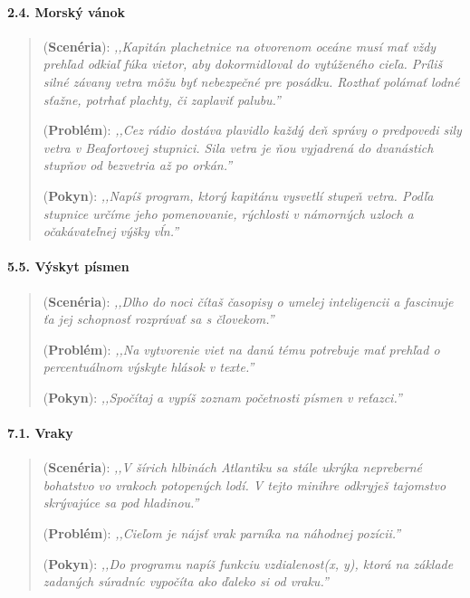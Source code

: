 \paragraph{2.4. Morský vánok}
\begin{quote}
(\textbf{Scenéria}): \textit{\small ,,Kapitán plachetnice na otvorenom oceáne musí mať vždy prehľad odkiaľ fúka vietor, aby dokormidloval do vytúženého cieľa. Príliš silné závany vetra môžu byť nebezpečné pre posádku. Rozthať polámať lodné sťažne, potrhať plachty, či zaplaviť palubu.''}

(\textbf{Problém}): \textit{\small ,,Cez rádio dostáva plavidlo každý deň správy o predpovedi sily vetra v Beafortovej stupnici. Sila vetra je ňou vyjadrená do dvanástich stupňov od bezvetria až po orkán.''} 

(\textbf{Pokyn}): \textit{\small ,,Napíš program, ktorý kapitánu vysvetlí stupeň vetra. Podľa stupnice určíme jeho pomenovanie, rýchlosti v námorných uzloch a očakávateľnej výšky vĺn.''}
\end{quote}

\paragraph{5.5. Výskyt písmen}
\begin{quote}
(\textbf{Scenéria}): \textit{\small ,,Dlho do noci čítaš časopisy o umelej inteligencii a fascinuje ťa jej schopnosť rozprávať sa s človekom.''} 

(\textbf{Problém}): \textit{\small ,,Na vytvorenie viet na danú tému potrebuje mať prehľad o percentuálnom výskyte hlások v texte.''}

(\textbf{Pokyn}): \textit{\small ,,Spočítaj a vypíš zoznam početnosti písmen v reťazci.''}
\end{quote}

\paragraph{7.1. Vraky}
\begin{quote}
(\textbf{Scenéria}): \textit{\small ,,V šírich hlbinách Atlantiku sa stále ukrýka nepreberné bohatstvo vo vrakoch potopených lodí. V tejto minihre odkryješ tajomstvo skrývajúce sa pod hladinou.''} 

(\textbf{Problém}): \textit{\small ,,Cieľom je nájsť vrak parníka na náhodnej pozícii.''} 

(\textbf{Pokyn}): \textit{\small ,,Do programu napíš funkciu vzdialenost(x, y), ktorá na základe zadaných súradníc vypočíta ako ďaleko si od vraku.''}
\end{quote}

